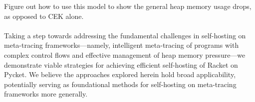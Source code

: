       \begin{todo}
        Figure out how to use this model to show the general heap memory usage drops, as opposed to CEK alone.
      \end{todo}



      \paragraph{}%
        Taking a step towards addressing the fundamental challenges in self-hosting on meta-tracing frameworks—namely, intelligent meta-tracing of programs with complex control flows and effective management of heap memory pressure—we demonstrate viable strategies for achieving efficient self-hosting of Racket on Pycket. We believe the approaches explored herein hold broad applicability, potentially serving as foundational methods for self-hosting on meta-tracing frameworks more generally.



